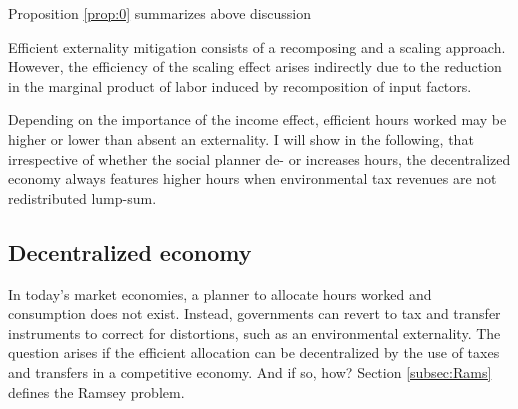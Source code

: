 Proposition \ref{prop:0} summarizes above discussion
\begin{prop}\label{prop:0}
	Efficient externality mitigation consists of a recomposing and a scaling approach. However, the efficiency of the scaling effect arises indirectly due to the reduction in the marginal product of labor induced by recomposition of input factors.
\end{prop}


Depending on the importance of the income effect, efficient hours worked may be higher or lower than  absent an externality. %
I will show in the following, that irrespective of whether the social planner de- or increases hours, the decentralized economy always features higher hours when environmental tax revenues are not redistributed lump-sum. 

\begin{comment}
\hrule
One can show that the total effect of a drop in the fossil labor share on hours worked is positive, i.e. $\frac{dh_{FB}}{ds}>0$, if $\theta<\frac{\varepsilon}{\varepsilon-s}$. If the income effect dominates, the social planner increases hours worked as the economy becomes less productive. 
Under the value for $\theta$ suggested by \cite{Boppart2019LaborPerspectiveb}, the efficient scale effect is to increase hours worked. When, however, the substitution effect outweighs or dominates the income effect - as commonly assumed in the public finance literature \citep{Heathcote2017OptimalFramework, LansBovenberg1994EnvironmentalTaxation, LansBovenberg1996OptimalAnalyses} \tr{CHECK this}!.
Nevertheless, the level of hours worked exceeds the efficient level irrespective of $\theta$ when no lump-sum transfers are available. 
When the efficient level of hours increases, though, the fossil labor share reduces even more to outweigh the increase in the externality.

content...
\end{comment}
\subsection{Decentralized economy}\label{subsec:decen_ec}

In today's market economies, a planner to allocate hours worked and consumption does not exist. Instead, governments can revert to tax and transfer instruments to correct for distortions, such as an environmental externality. The question arises if the efficient allocation can be decentralized by the use of taxes and transfers in a competitive economy. And if so, how? Section \ref{subsec:Rams} defines the Ramsey problem. %


